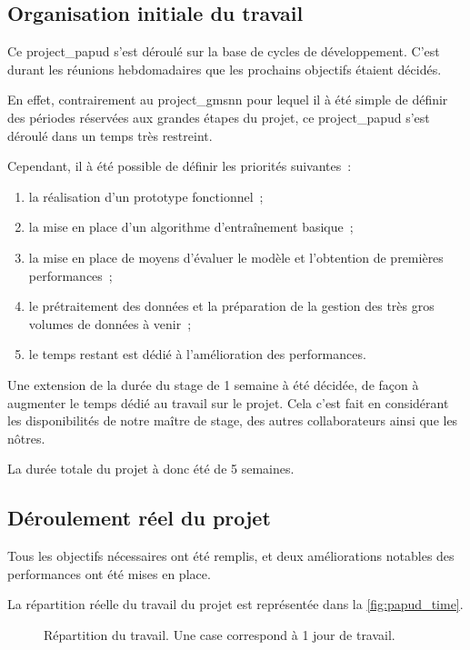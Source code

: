 \subsection{Organisation initiale du travail}
Ce \gls{project_papud} s'est déroulé sur la base de cycles de développement.
C'est durant les réunions hebdomadaires que les prochains objectifs étaient décidés.

En effet, contrairement au \gls{project_gmsnn} pour lequel il à été simple de définir des périodes réservées aux grandes étapes du projet, ce \gls{project_papud} s'est déroulé dans un temps très restreint.

Cependant, il à été possible de définir les priorités suivantes~:
\begin{enumerate}
	\item la réalisation d'un prototype fonctionnel~;
	\item la mise en place d'un algorithme d'entraînement basique~;
	\item la mise en place de moyens d'évaluer le modèle et l'obtention de premières performances~;
	\item le prétraitement des données et la préparation de la gestion des très gros volumes de données à venir~;
	\item le temps restant est dédié à l'amélioration des performances.
\end{enumerate}
\hspace{1em}

Une extension de la durée du stage de 1 semaine à été décidée, de façon à augmenter le temps dédié au travail sur le projet.
Cela c'est fait en considérant les disponibilités de notre maître de stage, des autres collaborateurs ainsi que les nôtres.

La durée totale du projet à donc été de 5 semaines.

\subsection{Déroulement réel du projet}
Tous les objectifs nécessaires ont été remplis, et deux améliorations notables des performances ont été mises en place.

La répartition réelle du travail du projet est représentée dans la \autoref{fig:papud_time}.

\begin{figure}[ht]
	\centering
	\caption[Répartition du travail]{Répartition du travail. Une case correspond à 1 jour de travail.}\label{fig:papud_time}
\end{figure}

